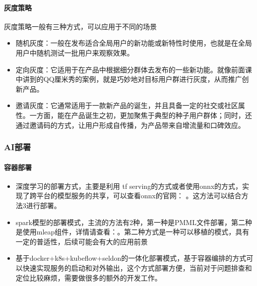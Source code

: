 \documentclass[letterpaper,11pt,english]{sphinxmanual}
\begin{document}
\paragraph{灰度策略}
\label{\detokenize{chapter_AI_dive/huidu:id2}}
灰度策略一般有三种方式，可以应用于不同的场景%
\begin{footnote}[868]\sphinxAtStartFootnote
{}
%
\end{footnote}
\begin{itemize}
\item {} 
随机灰度：一般在发布适合全局用户的新功能或新特性时使用，也就是在全局用户中随机测试一批用户来观察效果。

\item {} 
定向灰度：它适用于在产品中根据细分群体去发布的一些新功能。就像前面课中讲到的QQ厘米秀的案例，就是巧妙地对目标用户群进行灰度，从而推广创新产品。

\item {} 
邀请灰度：它通常适用于一款新产品的诞生，并且具备一定的社交或社区属性。一方面，能在产品诞生之初，更加聚焦于典型的种子用户群体；同时，还通过邀请码的方式，让用户形成自传播，为产品带来自增流量和口碑效应。

\end{itemize}


\subsubsection{AI部署}
\label{\detokenize{chapter_AI_dive/AI_deploy:ai}}\label{\detokenize{chapter_AI_dive/AI_deploy::doc}}

\paragraph{容器部署}
\label{\detokenize{chapter_AI_dive/AI_deploy:id1}}\begin{itemize}
\item {} 
深度学习的部署方式，主要是利用 tf
serving的方式或者使用onnx的方式，实现了跨平台的模型服务的共享，可以查看onnx的官网：
。这方法可以结合方法3进行部署。

\item {} 
spark模型的部署模式，主流的方法有2种，第一种是PMML文件部署，第二种是使用mleap组件，详情请查看：。第二种方式是一种可以移植的模式，具有一定的普适性，后续可能会有大的应用前景

\item {} 
基于docker+k8s+kubeflow+seldon的一体化部署模式，基于容器编排的方式可以快速实现服务的启动和对外输出，这个方式部署方便，当前对于问题排查和定位比较麻烦，需要做很多的额外的开发工作。

\end{itemize}
\end{document}
